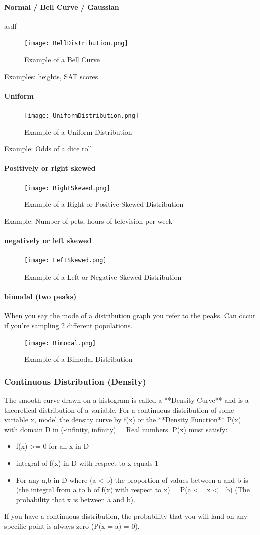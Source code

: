 \documentclass{article}
\newcommand{\p}[1]{\paragraph{#1}} %
\begin{document}
			\p{Normal / Bell Curve / Gaussian} asdf
			\begin{figure}[!htb]
				\centering
				\texttt{[image: BellDistribution.png]}
				\caption{Example of a Bell Curve}
			\end{figure} 
			Examples: heights, SAT scores
			\p{Uniform}
			\begin{figure}[!htb]
				\centering
				\texttt{[image: UniformDistribution.png]}
				\caption{Example of a Uniform Distribution}
			\end{figure} 
			Example: Odds of a dice roll
			\p{Positively or right skewed}
			\begin{figure}[!htb]
				\centering
				\texttt{[image: RightSkewed.png]}
				\caption{Example of a Right or Positive Skewed Distribution}
			\end{figure}
			Example: Number of pets, hours of television per week
			\p{negatively or left skewed}
			\begin{figure}[!htb]
				\centering
				\texttt{[image: LeftSkewed.png]}
				\caption{Example of a Left or Negative Skewed Distribution}
			\end{figure}
			\p{bimodal (two peaks)}
			When you say the mode of a distribution graph you refer to the peaks.
			Can occur if you're sampling 2 different populations.
			\begin{figure}[!htb]
				\centering
				\texttt{[image: Bimodal.png]}
				\caption{Example of a Bimodal Distribution}
			\end{figure}
		
		\subsubsection{Continuous Distribution (Density)}
		The smooth curve drawn on a histogram is called a **Density Curve** and is a theoretical
		distribution of a variable. For a continuous distribution of some variable x, model the
		density curve by f(x) or the **Density Function** P(x). with domain D in (-infinity, infinity) = Real numbers.
		P(x) must satisfy:
		\begin{itemize}
			\item{f(x) >= 0 for all x in D}
			\item{integral of f(x) in D with respect to x equals 1}
			\item{For any a,b in D where (a < b) the proportion of values between a and b is (the integral from a to b of f(x) with respect to x) = P(a <= x <= b) (The probability that x is between a and b).}
		\end{itemize}
		If you have a continuous distribution, the probability that you will land on any specific point is always zero (P(x = a) = 0).
		
\end{document}
